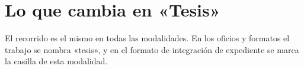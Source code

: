 \section{Lo que cambia en «Tesis»}
El recorrido es el mismo en todas las modalidades. En los oficios y formatos el trabajo se nombra «tesis», y en el formato de integración de expediente se marca la casilla de esta modalidad.
